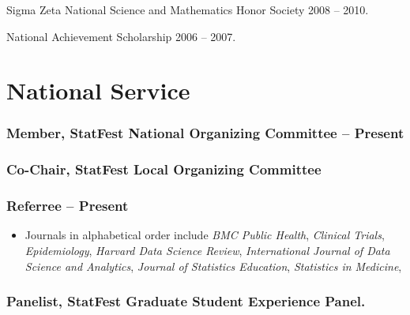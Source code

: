 \documentclass[
  fleqn, oneside]{article}
\providecommand{\tightlist}{%
  \setlength{\itemsep}{0pt}\setlength{\parskip}{0pt}}
\begin{document}
Sigma Zeta National Science and Mathematics Honor Society \hfill 2008 --
2010.

National Achievement Scholarship \hfill 2006 -- 2007.

\hypertarget{national-service}{%
\section{National Service}\label{national-service}}

\hypertarget{member-statfest-national-organizing-committee-2018-present}{%
\subsubsection{\texorpdfstring{Member, StatFest National Organizing
Committee \hfill{} --
Present}{Member, StatFest National Organizing Committee 2018 -- Present}}\label{member-statfest-national-organizing-committee-2018-present}}

\hypertarget{co-chair-statfest-local-organizing-committee-2018}{%
\subsubsection{\texorpdfstring{Co-Chair, StatFest Local Organizing
Committee
\hfill{}}{Co-Chair, StatFest Local Organizing Committee 2018}}\label{co-chair-statfest-local-organizing-committee-2018}}

\hypertarget{referree-2017-present}{%
\subsubsection{\texorpdfstring{Referree \hfill{} --
Present}{Referree 2017 -- Present}}\label{referree-2017-present}}

\begin{itemize}
\tightlist
\item
  Journals in alphabetical order include \emph{BMC Public Health},
  \emph{Clinical Trials}, \emph{Epidemiology}, \emph{Harvard Data
  Science Review}, \emph{International Journal of Data Science and
  Analytics}, \emph{Journal of Statistics Education}, \emph{Statistics
  in Medicine}, 
\end{itemize}

\hypertarget{panelist-statfest-graduate-student-experience-panel.}{%
\subsubsection{Panelist, StatFest Graduate Student Experience
Panel.}\label{panelist-statfest-graduate-student-experience-panel.}}
\end{document}

